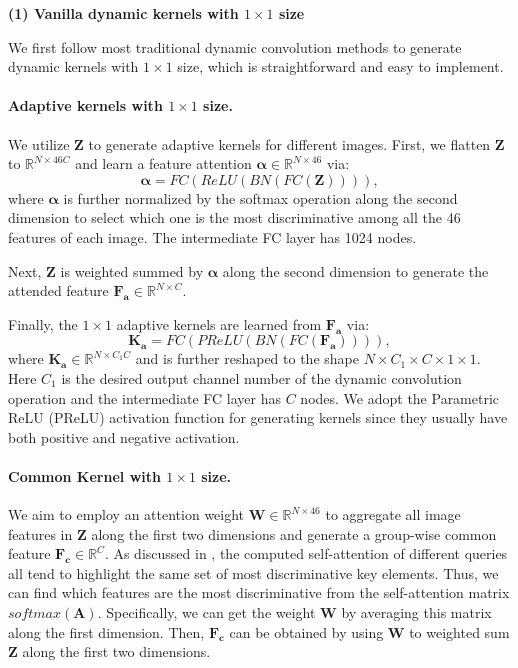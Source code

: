 \documentclass[10pt,twocolumn,letterpaper]{article}
\begin{document}
\vspace{3mm}
\noindent\textbf{(1) Vanilla dynamic kernels with $1 \times 1$ size}
\vspace{2mm}

We first follow most traditional dynamic convolution methods \cite{qi2020pointins, tian2020conditional} to generate dynamic kernels with $ 1 \times 1$ size, which is straightforward and easy to implement.

\vspace{-3mm}
\paragraph{Adaptive kernels with ${1 \times 1}$ size.}
We utilize $\bm{Z}$ to generate adaptive kernels for different images. First, we flatten $\bm{Z}$ to $\mathbb{R}^{N\times 46C}$ and learn a feature attention $\bm{\alpha}\in{\mathbb{R}^{N\times46}}$ via:
\begin{equation} \label{1x1AdaKernelatt}
\bm{\alpha}=FC(ReLU(BN(FC(\bm{Z})))),
\end{equation}
where $\bm{\alpha}$ is further normalized by the softmax operation along the second dimension to select which one is the most discriminative among all the 46 features of each image. The intermediate FC layer has 1024 nodes.

Next, $\bm{Z}$ is weighted summed by $\bm{\alpha}$ along the second dimension to generate the attended feature $\bm{F_{a}}\in{\mathbb{R}^{N\times C}}$.

Finally, the ${1 \times 1}$ adaptive kernels are learned from $\bm{F_{a}}$ via:
\begin{equation} \label{1x1AdaKernelatt}
\bm{K_a}=FC(PReLU(BN(FC(\bm{F_{a}})))),
\end{equation}
where $\bm{K_{a}}\in{\mathbb{R}^{N\times C_1C}}$ and is further reshaped to the shape ${N \times {C_1\times{C\times{1\times 1}}}}$. Here $C_1$ is the desired output channel number of the dynamic convolution operation and the intermediate FC layer has $C$ nodes. We adopt the Parametric ReLU (PReLU) \cite{he2015delving} activation function for generating kernels since they usually have both positive and negative activation.

\vspace{-3mm}
\paragraph{Common Kernel with ${1 \times 1}$ size.}
We aim to employ an attention weight $\bm{W}\in{\mathbb{R}^{N \times 46}}$ to aggregate all image features in $\bm{Z}$ along the first two dimensions and generate a group-wise common feature $\bm{F_c}\in{\mathbb{R}^{C}}$.
As discussed in \cite{cao2019gcnet}, the computed self-attention of different queries all tend to highlight the same set of most discriminative key elements. Thus, we can find which features are the most discriminative from the self-attention matrix $softmax(\bm{A})$. Specifically, we can get the weight $\bm{W}$ by averaging this matrix along the first dimension. Then, $\bm{F_c}$ can be obtained by using $\bm{W}$ to weighted sum $\bm{Z}$ along the first two dimensions.
\end{document}
